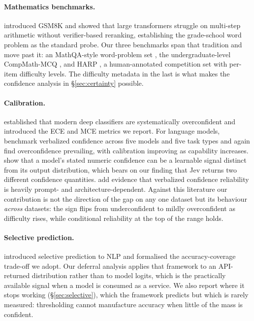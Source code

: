 \documentclass[11pt]{article}
\begin{document}
\paragraph{Mathematics benchmarks.}
\citet{cobbe2021gsm8k} introduced GSM8K and showed that large transformers struggle on multi-step arithmetic without verifier-based reranking, establishing the grade-school word problem as the standard probe. Our three benchmarks span that tradition and move past it: an MathQA-style word-problem set \citep{nlp2025math}, the undergraduate-level CompMath-MCQ \citep{raimondi2026compmath}, and HARP \citep{yue2024harp}, a human-annotated competition set with per-item difficulty levels. The difficulty metadata in the last is what makes the confidence analysis in \S\ref{sec:certainty} possible.

\paragraph{Calibration.}
\citet{guo2017calibration} established that modern deep classifiers are systematically overconfident and introduced the ECE and MCE metrics we report. For language models, \citet{xiong2024can} benchmark verbalized confidence across five models and five task types and again find overconfidence prevailing, with calibration improving as capability increases. \citet{lin2022teaching} show that a model's stated numeric confidence can be a learnable signal distinct from its output distribution, which bears on our finding that Jev returns two different confidence quantities. \citet{yang2024verbalized} add evidence that verbalized confidence reliability is heavily prompt- and architecture-dependent. Against this literature our contribution is not the direction of the gap on any one dataset but its behaviour \emph{across} datasets: the sign flips from underconfident to mildly overconfident as difficulty rises, while conditional reliability at the top of the range holds.

\paragraph{Selective prediction.}
\citet{xin2021abstention} introduced selective prediction to NLP and formalised the accuracy-coverage trade-off we adopt. Our deferral analysis applies that framework to an API-returned distribution rather than to model logits, which is the practically available signal when a model is consumed as a service. We also report where it stops working (\S\ref{sec:selective}), which the framework predicts but which is rarely measured: thresholding cannot manufacture accuracy when little of the mass is confident.
\end{document}
